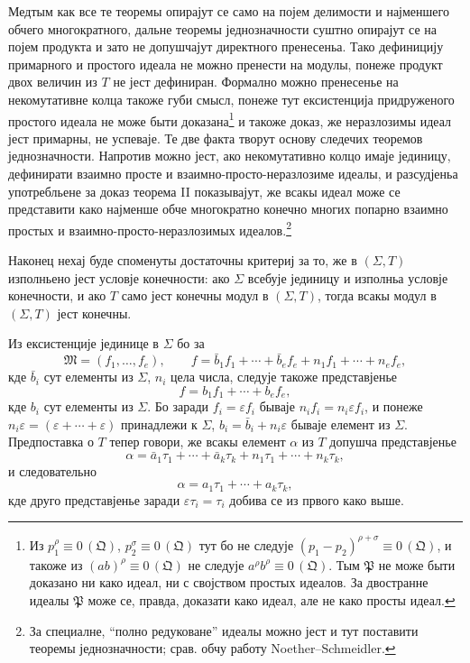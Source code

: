 ﻿\documentclass[11pt]{article}
\newcommand{\ideal}[1]{\mathfrak{#1}}
\newcommand{\eqzero}[1]{\equiv 0\,(#1)}
\begin{document}
Медтым как все те теоремы опирајут се само на појем делимости и најменшего обчего многократного, дальне теоремы једнозначности суштно опирајут се на појем продукта и зато не допушчајут директного пренесеньа. Тако дефиницију примарного и простого идеала не можно пренести на модулы, понеже продукт двох величин из \(T\) не јест дефиниран. Формално можно пренесенье на некомутативне колца такоже губи смысл, понеже тут ексистенција придруженого простого идеала не може быти доказана\footnote{Из \(p_1^\rho\eqzero{\ideal Q}\), \(p_2^\sigma\eqzero{\ideal Q}\) тут бо не следује \((p_1-p_2)^{\rho+\sigma}\eqzero{\ideal Q}\), и такоже из \((ab)^\rho\eqzero{\ideal Q}\) не следује \(a^\rho b^\rho\eqzero{\ideal Q}\). Тым \(\ideal P\) не може быти доказано ни како идеал, ни с својством простых идеалов. За двостранне идеалы \(\ideal P\) може се, правда, доказати како идеал, але не како просты идеал.} и такоже доказ, же неразлозимы идеал јест примарны, не успеваје. Те две факта творут основу следечих теоремов једнозначности. Напротив можно јест, ако некомутативно колцо имаје јединицу, дефинирати взаимно просте и взаимно-просто-неразлозиме идеалы, и разсудјеньа употребльене за доказ теорема II показывајут, же всакы идеал може се представити како најменше обче многократно конечно многих попарно взаимно простых и взаимно-просто-неразлозимых идеалов.\footnote{За специалне, ``полно редуковане'' идеалы можно јест и тут поставити теоремы једнозначности; срав. обчу работу Noether--Schmeidler.}

Наконец нехај буде споменуты достаточны критериј за то, же в \((\Sigma,T)\) изполньено јест условје конечности: ако \(\Sigma\) всебује јединицу и изполньа условје конечности, и ако \(T\) само јест конечны модул в \((\Sigma,T)\), тогда всакы модул в \((\Sigma,T)\) јест конечны.

Из ексистенције јединице в \(\Sigma\) бо за
\[
 \ideal M=(f_1,\ldots,f_e),\qquad
 f=\bar b_1f_1+\cdots+\bar b_ef_e+n_1f_1+\cdots+n_ef_e,
\]
кде \(\bar b_i\) сут елементы из \(\Sigma\), \(n_i\) цела числа, следује такоже представјенье
\[
 f=b_1f_1+\cdots+b_ef_e,
\]
кде \(b_i\) сут елементы из \(\Sigma\). Бо заради \(f_i=\varepsilon f_i\) бываје \(n_if_i=n_i\varepsilon f_i\), и понеже \(n_i\varepsilon=(\varepsilon+\cdots+\varepsilon)\) принадлежи к \(\Sigma\), \(b_i=\bar b_i+n_i\varepsilon\) бываје елемент из \(\Sigma\). Предпоставка о \(T\) тепер говори, же всакы елемент \(\alpha\) из \(T\) допушча представјенье
\[
 \alpha=\bar a_1\tau_1+\cdots+\bar a_k\tau_k+n_1\tau_1+\cdots+n_k\tau_k,
\]
и следовательно
\[
 \alpha=a_1\tau_1+\cdots+a_k\tau_k,
\]
кде друго представјенье заради \(\varepsilon\tau_i=\tau_i\) добива се из првого како выше.
\end{document}

